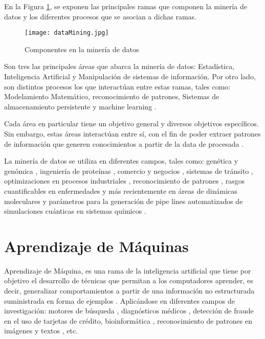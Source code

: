 En la Figura \ref{intro1}, se exponen las principales ramas que componen la minería de datos y los diferentes procesos que se asocian a dichas ramas.

\begin{figure}[!h]
	
	\centering
	\texttt{[image: dataMining.jpg]}
	\caption{Componentes en la minería de datos}
	\label{intro1}
\end{figure}

Son tres las principales áreas que abarca la minería de datos: Estadística, Inteligencia Artificial y Manipulación de sistemas de información. Por otro lado, son distintos procesos los que interactúan entre estas ramas, tales como: Modelamiento Matemático, reconocimiento de patrones, Sistemas de almacenamiento persistente y machine learning \cite{hand2006data}.

Cada área en particular tiene un objetivo general y diversos objetivos específicos. Sin embargo, estas áreas interactúan entre sí, con el fin de poder extraer patrones de información que generen conocimientos a partir de la data de procesada \cite{berry2004data}.

La minería de datos se utiliza en diferentes campos, tales como: genética y genómica \cite{Lee2008, Rebhan1998}, ingeniería de proteínas \cite{han2009research, 4548625, li2008fast}, comercio y negocios \cite{hofmann2013rapidminer}, sistemas de tránsito \cite{Ma2013}, optimizaciones en procesos industriales \cite{Chien2008, 8051033, 983448}, reconocimiento de patrones \cite{jain1988algorithms, fayyad1996data}, rasgos cuantificables en enfermedades \cite{Yoo2012, obenshain2004, LDuan} y más recientemente en áreas de dinámicas moleculares \cite{Chen2017, Yang:2005:GFM:1081870.1081962} y parámetros para la generación de pipe lines automatizados de simulaciones cuánticas en sistemas químicos \cite{MAO2004787, PhysRevLett.91.135503, Ramakrishnan2015}.

\section{Aprendizaje de Máquinas}

Aprendizaje de Máquina, es una rama de la inteligencia artificial que tiene por objetivo el desarrollo de técnicas que permitan a los computadores aprender, es decir, generalizar comportamientos a partir de una información no estructurada suministrada en forma de ejemplos \cite{michie1994machine}. Aplicándose en diferentes campos de investigación: motores de búsqueda \cite{cooley1997web}, diagnósticos médicos \cite{7912315,ABDELAZIZ2018117}, detección de fraude en el uso de tarjetas de crédito, bioinformática \cite{juanito}, reconocimiento de patrones en imágenes \cite{imageA} y textos \cite{netzer2011reading,alm2005emotions}, etc. 

